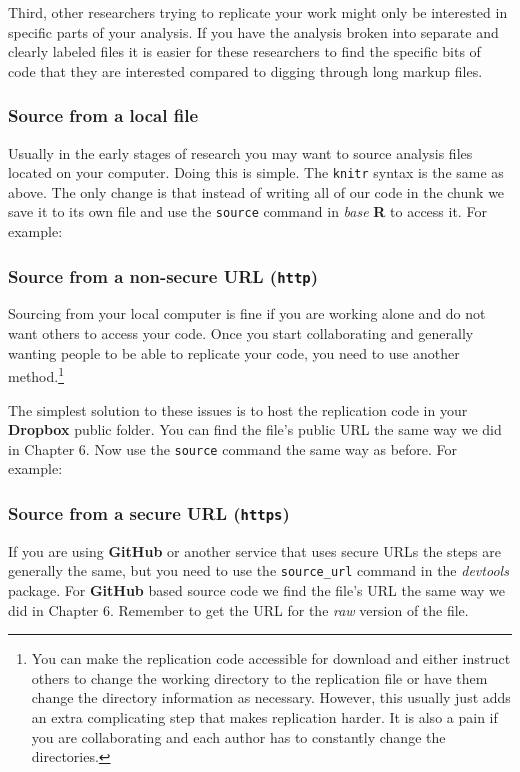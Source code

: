 \documentclass[ChapterTOCs,krantz1]{krantz}\usepackage{graphicx, color}
\begin{document}
Third, other researchers trying to replicate your work might only be
interested in specific parts of your analysis. If you have the analysis
broken into separate and clearly labeled files it is easier for these
researchers to find the specific bits of code that they are interested
compared to digging through long markup files.

\subsubsection{Source from a local file}

Usually in the early stages of research you may want to source analysis
files located on your computer. Doing this is simple. The \texttt{knitr}
syntax is the same as above. The only change is that instead of writing
all of our code in the chunk we save it to its own file and use the
\texttt{source} command in \emph{base} \textbf{R} to access it. For
example:

\subsubsection{Source from a non-secure URL (\texttt{http})}

Sourcing from your local computer is fine if you are working alone and do not want others to access your code. Once you start collaborating and generally wanting people to be able to replicate your code, you need to
use another method.\footnote{You can make the replication code accessible for download and either instruct others to change the working directory to the replication file or have them change the directory information as necessary. However, this usually just adds an extra complicating step that makes replication harder. It is also a   pain if you are collaborating and each author has to constantly change the directories.}

The simplest solution to these issues is to host the replication code in your \textbf{Dropbox} public folder. You can find the file's public URL the same way we did in Chapter 6. Now use the \texttt{source} command the same way as before. For example:

\subsubsection{Source from a secure URL (\texttt{https})}

If you are using \textbf{GitHub} or another service that uses secure
URLs the steps are generally the same, but you need to use the
\texttt{source\_url} command in the \emph{devtools} package. For
\textbf{GitHub} based source code we find the file's URL the same way we
did in Chapter 6. Remember to get the URL for the \emph{raw} version of
the file.
\end{document}
